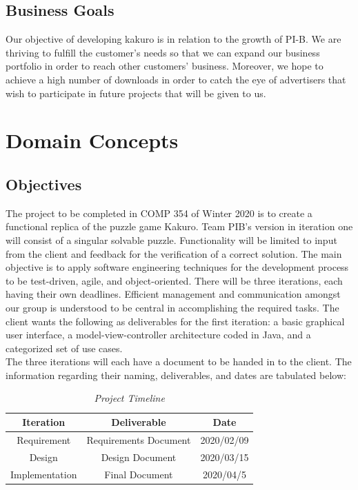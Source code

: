 \documentclass[12pt]{article}
\begin{document}
\subsection{Business Goals}

\hspace{\parindent} Our objective of developing kakuro is in relation to the growth of PI-B. We are thriving to fulfill the customer’s needs so that we can expand our business portfolio in order to reach other customers’ business. Moreover, we hope to achieve a high number of downloads in order to catch the eye of advertisers that wish to participate in future projects that will be given to us.


\pagestyle{plain} 
\section{Domain Concepts}
\subsection{Objectives}

The project to be completed in COMP 354 of Winter 2020 is to create a functional replica of the puzzle game Kakuro. Team PIB's version in iteration one will consist of a singular solvable puzzle. Functionality will be limited to input from the client and feedback for the verification of a correct solution. The main objective is to apply software engineering techniques for the development process to be test-driven, agile, and object-oriented. There will be three iterations, each having their own deadlines. Efficient management and communication amongst our group is understood to be central in accomplishing the required tasks. The client wants the following as deliverables for the first iteration: a basic graphical user interface, a model-view-controller architecture coded in Java, and a categorized set of use cases.\\  
The three iterations will each have a document to be handed in to the client. The information regarding their naming, deliverables, and dates are tabulated below:\\

\begin{table}[htbp]
\begin{center}
\begin{tabular}{| c | c | c |}
\hline
\cellcolor{gray}Iteration & \cellcolor{gray}Deliverable & \cellcolor{gray} Date \\
\hline
Requirement & Requirements Document & 2020/02/09 \\
\hline
Design & Design Document & 2020/03/15 \\
\hline
Implementation & Final Document & 2020/04/5 \\
\hline
\end{tabular}
\caption*{\textit {Project Timeline}}
\end{center}
\end{table}
\end{document}
